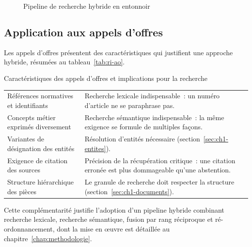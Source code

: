 \begin{figure}[htbp]
  \centering
  \resizebox{\linewidth}{!}{}
  \caption{Pipeline de recherche hybride en entonnoir}
  \label{fig:pipeline-hybride}
\end{figure}

\subsection{Application aux appels d'offres}

Les appels d'offres présentent des caractéristiques qui justifient une approche
hybride, résumées au tableau~\ref{tab:ri-ao}.

\begin{btptable}{Caractéristiques des appels d'offres et implications pour la recherche}
\label{tab:ri-ao}
\begin{tabularx}{\linewidth}{@{}L{3.9cm} Y@{}}
\toprule
{}
 &  \\
\midrule
Références normatives et identifiants & Recherche lexicale indispensable~: un numéro d'article ne se paraphrase pas. \\
Concepts métier exprimés diversement & Recherche sémantique indispensable~: la même exigence se formule de multiples façons. \\
Variantes de désignation des entités & Résolution d'entités nécessaire (section~\ref{sec:ch1-entites}). \\
Exigence de citation des sources & Précision de la récupération critique~: une citation erronée est plus dommageable qu'une abstention. \\
Structure hiérarchique des pièces & Le granule de recherche doit respecter la structure (section~\ref{sec:ch1-documents}). \\
\bottomrule
\end{tabularx}
\end{btptable}

Cette complémentarité justifie l'adoption d'un pipeline hybride combinant
recherche lexicale, recherche sémantique, fusion par rang réciproque et
ré-ordonnancement, dont la mise en \oe uvre est détaillée au
chapitre~\ref{chap:methodologie}.
